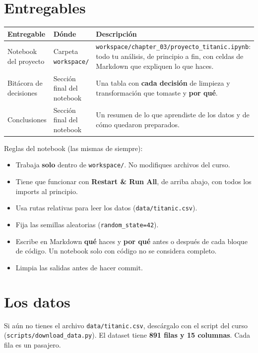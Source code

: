 \documentclass[11pt,a4paper]{article}
\newcommand{\col}[1]{\texttt{#1}}
\begin{document}
\section*{Entregables}

\begin{tabularx}{\textwidth}{@{}l l X@{}}
\toprule
\textbf{Entregable} & \textbf{Dónde} & \textbf{Descripción} \\
\midrule
Notebook del proyecto & Carpeta \col{workspace/} &
  \col{workspace/chapter\_03/proyecto\_titanic.ipynb}: todo tu análisis, de principio a
  fin, con celdas de Markdown que expliquen lo que haces. \\
Bitácora de decisiones & Sección final del notebook &
  Una tabla con \textbf{cada decisión} de limpieza y transformación que tomaste y \textbf{por qué}. \\
Conclusiones & Sección final del notebook &
  Un resumen de lo que aprendiste de los datos y de cómo quedaron preparados. \\
\bottomrule
\end{tabularx}

\medskip
Reglas del notebook (las mismas de siempre):
\begin{itemize}
  \item Trabaja \textbf{solo} dentro de \col{workspace/}. No modifiques archivos del curso.
  \item Tiene que funcionar con \textbf{Restart \& Run All}, de arriba abajo, con todos los imports al principio.
  \item Usa rutas relativas para leer los datos (\col{data/titanic.csv}).
  \item Fija las semillas aleatorias (\col{random\_state=42}).
  \item Escribe en Markdown \textbf{qué} haces y \textbf{por qué} antes o después de cada bloque de código.
        Un notebook solo con código no se considera completo.
  \item Limpia las salidas antes de hacer commit.
\end{itemize}

\section*{Los datos}

Si aún no tienes el archivo \col{data/titanic.csv}, descárgalo con el script del curso
(\col{scripts/download\_data.py}). El dataset tiene \textbf{891 filas y 15 columnas}.
Cada fila es un pasajero.
\end{document}
